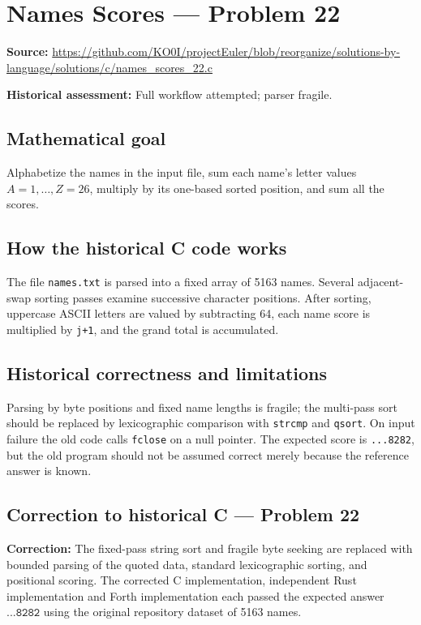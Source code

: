 \section{Names Scores --- Problem 22}
\label{prob:22}
\noindent\textbf{Source:} \url{https://github.com/KO0I/projectEuler/blob/reorganize/solutions-by-language/solutions/c/names_scores_22.c}

\noindent\textbf{Historical assessment:} Full workflow attempted; parser fragile.

\subsection*{Mathematical goal}
Alphabetize the names in the input file, sum each name's letter values \(A=1,\ldots,Z=26\), multiply by its one-based sorted position, and sum all the scores.

\subsection*{How the historical C code works}
The file \verb|names.txt| is parsed into a fixed array of 5163 names. Several adjacent-swap sorting passes examine successive character positions. After sorting, uppercase ASCII letters are valued by subtracting 64, each name score is multiplied by \verb|j+1|, and the grand total is accumulated.

\subsection*{Historical correctness and limitations}
Parsing by byte positions and fixed name lengths is fragile; the multi-pass sort should be replaced by lexicographic comparison with \verb|strcmp| and \verb|qsort|. On input failure the old code calls \verb|fclose| on a null pointer. The expected score is \texttt{...8282}, but the old program should not be assumed correct merely because the reference answer is known.

\subsection*{Correction to historical C --- Problem 22}
{\color{red}\textbf{Correction:} The fixed-pass string sort and fragile byte seeking are replaced with bounded parsing of the quoted data, standard lexicographic sorting, and positional scoring. The corrected C implementation, independent Rust implementation and Forth implementation each passed the expected answer \(\texttt{...8282}\) using the original repository dataset of 5163 names.}
